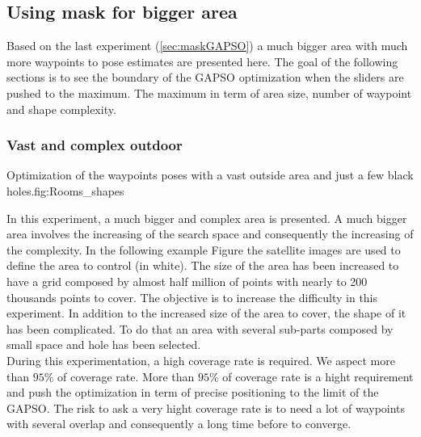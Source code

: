 	\subsection{Using mask for bigger area}
	Based on the last experiment (\ref{sec:maskGAPSO}) a much bigger area with much more waypoints to pose estimates are presented here. The goal of the following sections is to see the boundary of the  GAPSO optimization when the sliders are pushed to the maximum. The maximum in term of area size, number of waypoint and shape complexity.
	
		\subsubsection{Vast and complex outdoor}\label{sec:fey_map}

\begin{mfigures}[!]{ Optimization of the waypoints poses with a vast outside area and just a few  black holes.}{fig:Rooms_shapes} \centering
{}
\hspace{1cm}
\hspace{1cm}
\tabsimuposeFley
\end{mfigures}


In this experiment, a much bigger and complex area is presented.
		A much bigger area involves the increasing of the search space and consequently the increasing of the complexity. 
In the following example Figure  the satellite images are used to define the area to control (in white). The size of the area has been increased to have a grid composed by almost half million of points with nearly to 200 thousands points to cover. 
The objective is to increase the difficulty in this experiment. In addition to the increased size of the area to cover, the shape of it has been complicated. To do that an area with several sub-parts composed by small space and hole has been selected.\\
During this experimentation, a high coverage rate is required. We aspect more than $95\%$ of coverage rate. More than $95\%$ of coverage rate is a hight requirement and push the optimization in term of precise positioning to the limit of the GAPSO. The risk to ask a very hight coverage rate is to need a lot of waypoints with several overlap and consequently a long time before to converge. 

